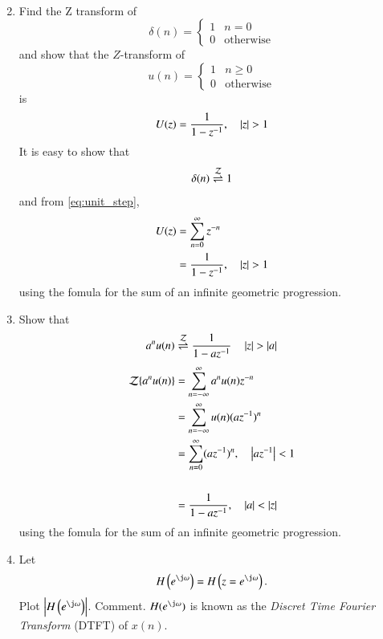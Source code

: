 \documentclass[journal,12pt,twocolumn]{IEEEtran}
\renewcommand\thesection{\arabic{section}}
\begin{document}
\begin{enumerate}[label=\thesection.\arabic*]
\begin{align}
\label{eq:freq_resp}
\end{align}
%
\item Find the Z transform of 
\begin{equation}
\delta(n)
=
\begin{cases}
1 & n = 0
\\
0 & \text{otherwise}
\end{cases}
\end{equation}
and show that the $Z$-transform of
\begin{equation}
\label{eq:unit_step}
u(n)
=
\begin{cases}
1 & n \ge 0
\\
0 & \text{otherwise}
\end{cases}
\end{equation}
is
\begin{equation}
U(z) = \frac{1}{1-z^{-1}}, \quad \left\vert z\right\vert > 1
\end{equation}
\solution It is easy to show that
\begin{equation}
\delta(n) \overset{\mathcal{Z}}{ \rightleftharpoons} 1
\end{equation}
and from \eqref{eq:unit_step},
\begin{align}
U(z) &= \sum _{n= 0}^{\infty}z^{-n}
\\
&=\frac{1}{1-z^{-1}}, \quad \left\vert z\right\vert > 1
\end{align}
using the fomula for the sum of an infinite geometric progression.
%
\item Show that 
\begin{equation}
\label{eq:anun}
a^nu(n) \overset{\mathcal{Z}}{ \rightleftharpoons} \frac{1}{1-az^{-1}} \quad \left\vert z\right\vert > \left\vert a\right\vert
\end{equation}
\solution
\begin{align}
{\mathcal {Z}}\{a^nu(n)\} &=\sum _{n=-\infty }^{\infty }a^nu(n)z^{-n}
\\
&=\sum _{n=-\infty }^{\infty }u(n) (az^{-1})^{n}
\\
&=\sum _{n=0 }^{\infty }(az^{-1})^{n} , \quad \left\vert az^{-1}\right\vert < 1\\
\\
&= \frac{1}{1-az^{-1}} , \quad \left\vert a\right\vert < \left\vert z\right\vert
\end{align}
using the fomula for the sum of an infinite geometric progression.
%
\item 
Let
\begin{equation}
H\brak{e^{\j \omega}} = H\brak{z = e^{\j \omega}}.
\end{equation}
Plot $\abs{H\brak{e^{\j \omega}}}$.  Comment.  $H(e^{\j \omega})$ is
known as the {\em Discret Time Fourier Transform} (DTFT) of $x(n)$.

\end{enumerate}
\end{document}

